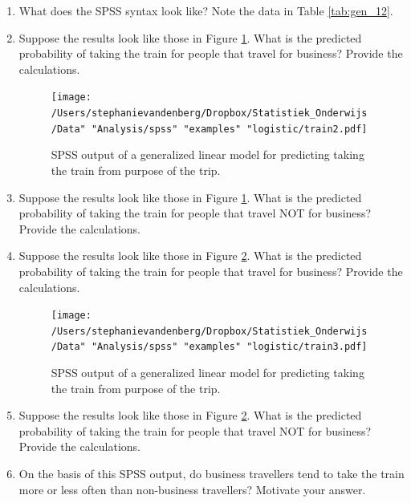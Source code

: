 \documentclass[]{book}\usepackage[]{graphicx}\usepackage[]{color}
\begin{document}
\begin{enumerate}

\item

What does the SPSS syntax look like? Note the data in Table \ref{tab:gen_12}.


\item
Suppose the results look like those in Figure \ref{fig:train2}. What is the predicted probability of taking the train for people that travel for business? Provide the calculations.


\begin{figure}[h]
    \begin{center}
       \texttt{[image: /Users/stephanievandenberg/Dropbox/Statistiek\_Onderwijs/Data" "Analysis/spss" "examples" "logistic/train2.pdf]}
    \end{center}
     \caption{SPSS output of a generalized linear model for predicting taking the train from purpose of the trip.}
    \label{fig:train2}
\end{figure}


\item Suppose the results look like those in Figure \ref{fig:train2}. What is the predicted probability of taking the train for people that travel NOT for business? Provide the calculations.



\item
Suppose the results look like those in Figure \ref{fig:train3}. What is the predicted probability of taking the train for people that travel for business? Provide the calculations.


\begin{figure}[h]
    \begin{center}
       \texttt{[image: /Users/stephanievandenberg/Dropbox/Statistiek\_Onderwijs/Data" "Analysis/spss" "examples" "logistic/train3.pdf]}
    \end{center}
     \caption{SPSS output of a generalized linear model for predicting taking the train from purpose of the trip.}
    \label{fig:train3}
\end{figure}


\item Suppose the results look like those in Figure \ref{fig:train3}. What is the predicted probability of taking the train for people that travel NOT for business? Provide the calculations.


\item On the basis of this SPSS output, do business travellers tend to take the train more or less often than non-business travellers? Motivate your answer.



\end{enumerate}
\end{document}
